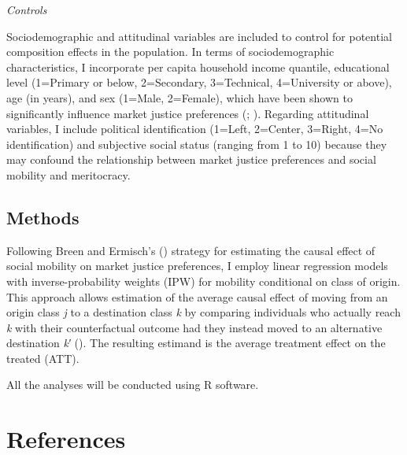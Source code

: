 \documentclass[
  12pt,
]{article}
\begin{document}
\emph{Controls}

Sociodemographic and attitudinal variables are included to control for
potential composition effects in the population. In terms of
sociodemographic characteristics, I incorporate per capita household
income quantile, educational level (1=Primary or below, 2=Secondary,
3=Technical, 4=University or above), age (in years), and sex (1=Male,
2=Female), which have been shown to significantly influence market
justice preferences (; ). Regarding
attitudinal variables, I include political identification (1=Left,
2=Center, 3=Right, 4=No identification) and subjective social status
(ranging from 1 to 10) because they may confound the relationship
between market justice preferences and social mobility and meritocracy.

\subsection{Methods}\label{methods}

Following Breen and Ermisch's ()
strategy for estimating the causal effect of social mobility on market
justice preferences, I employ linear regression models with
inverse-probability weights (IPW) for mobility conditional on class of
origin. This approach allows estimation of the average causal effect of
moving from an origin class \emph{j} to a destination class \emph{k} by
comparing individuals who actually reach \emph{k} with their
counterfactual outcome had they instead moved to an alternative
destination \emph{k′} (). The resulting estimand is the average treatment effect
on the treated (ATT).

All the analyses will be conducted using R software.

\section{References}\label{references}
\end{document}

